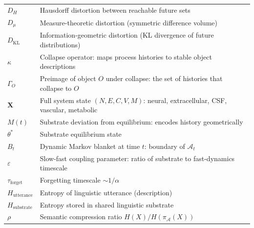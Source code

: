 \documentclass[12pt,a4paper]{article}
\begin{document}
\begin{center}
\begin{tabular}{lp{9cm}}
$D_H$ & Hausdorff distortion between reachable future sets \\[4pt]
$D_\mu$ & Measure-theoretic distortion (symmetric difference volume) \\[4pt]
$D_{\mathrm{KL}}$ & Information-geometric distortion (KL divergence of future distributions) \\[4pt]
$\kappa$ & Collapse operator: maps process histories to stable object descriptions \\[4pt]
$\Gamma_O$ & Preimage of object $O$ under collapse: the set of histories that collapse to $O$ \\[4pt]
$\mathbf{X}$ & Full system state $(N, E, C, V, M)$: neural, extracellular, CSF, vascular, metabolic \\[4pt]
$M(t)$ & Substrate deviation from equilibrium: encodes history geometrically \\[4pt]
$\theta^*$ & Substrate equilibrium state \\[4pt]
$B_t$ & Dynamic Markov blanket at time $t$: boundary of $\mathcal{A}_t$ \\[4pt]
$\varepsilon$ & Slow-fast coupling parameter: ratio of substrate to fast-dynamics timescale \\[4pt]
$\tau_{\text{forget}}$ & Forgetting timescale $\sim 1/\alpha$ \\[4pt]
$H_{\text{utterance}}$ & Entropy of linguistic utterance (description) \\[4pt]
$H_{\text{substrate}}$ & Entropy stored in shared linguistic substrate \\[4pt]
$\rho$ & Semantic compression ratio $H(X)/H(\pi_\mathcal{A}(X))$ \\[4pt]
\bottomrule
\end{tabular}
\end{center}
\end{document}
